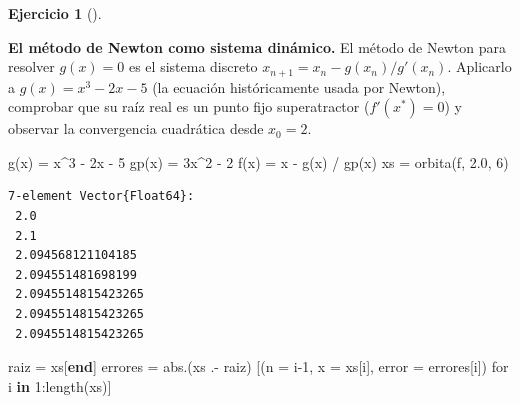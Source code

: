 \documentclass[
  spanish,
  a4paper,
]{scrreport}
\newenvironment{Shaded}{\begin{snugshade}}{\end{snugshade}}
\newcommand{\FloatTok}[1]{\textcolor[rgb]{0.68,0.00,0.00}{#1}}
\newcommand{\FunctionTok}[1]{\textcolor[rgb]{0.28,0.35,0.67}{#1}}
\newcommand{\KeywordTok}[1]{\textcolor[rgb]{0.00,0.23,0.31}{\textbf{#1}}}
\newcommand{\NormalTok}[1]{\textcolor[rgb]{0.00,0.23,0.31}{#1}}
\newcommand{\OperatorTok}[1]{\textcolor[rgb]{0.37,0.37,0.37}{#1}}
\theoremstyle{definition}
\newtheorem{exercise}{Ejercicio}[chapter]
\theoremstyle{remark}
\begin{document}
\begin{exercise}[]\protect\hypertarget{exr-newton-discreto}{}\label{exr-newton-discreto}

\textbf{El método de Newton como sistema dinámico.} El método de Newton
para resolver \(g(x)=0\) es el sistema discreto
\(x_{n+1} = x_n - g(x_n)/g'(x_n)\). Aplicarlo a \(g(x) = x^3 - 2x - 5\)
(la ecuación históricamente usada por Newton), comprobar que su raíz
real es un punto fijo superatractor (\(f'(x^*)=0\)) y observar la
convergencia cuadrática desde \(x_0 = 2\).

\begin{tcolorbox}[enhanced jigsaw, arc=.35mm, bottomrule=.15mm, bottomtitle=1mm, breakable, colback=white, colbacktitle=quarto-callout-tip-color!10!white, colframe=quarto-callout-tip-color-frame, coltitle=black, left=2mm, leftrule=.75mm, opacityback=0, opacitybacktitle=0.6, rightrule=.15mm, title=\textcolor{quarto-callout-tip-color}{\faLightbulb}\hspace{0.5em}{Solución}, titlerule=0mm, toprule=.15mm, toptitle=1mm]

\begin{Shaded}
\begin{Highlighting}[]
\FunctionTok{g}\NormalTok{(x) }\OperatorTok{=}\NormalTok{ x}\OperatorTok{\^{}}\FloatTok{3} \OperatorTok{{-}} \FloatTok{2}\NormalTok{x }\OperatorTok{{-}} \FloatTok{5}
\FunctionTok{gp}\NormalTok{(x) }\OperatorTok{=} \FloatTok{3}\NormalTok{x}\OperatorTok{\^{}}\FloatTok{2} \OperatorTok{{-}} \FloatTok{2}
\FunctionTok{f}\NormalTok{(x) }\OperatorTok{=}\NormalTok{ x }\OperatorTok{{-}} \FunctionTok{g}\NormalTok{(x) }\OperatorTok{/} \FunctionTok{gp}\NormalTok{(x)}
\NormalTok{xs }\OperatorTok{=} \FunctionTok{orbita}\NormalTok{(f, }\FloatTok{2.0}\NormalTok{, }\FloatTok{6}\NormalTok{)}
\end{Highlighting}
\end{Shaded}

\begin{verbatim}
7-element Vector{Float64}:
 2.0
 2.1
 2.094568121104185
 2.094551481698199
 2.0945514815423265
 2.0945514815423265
 2.0945514815423265
\end{verbatim}

\begin{Shaded}
\begin{Highlighting}[]
\NormalTok{raiz }\OperatorTok{=}\NormalTok{ xs[}\KeywordTok{end}\NormalTok{]}
\NormalTok{errores }\OperatorTok{=} \FunctionTok{abs}\NormalTok{.(xs }\OperatorTok{.{-}}\NormalTok{ raiz)}
\NormalTok{[(n }\OperatorTok{=}\NormalTok{ i}\OperatorTok{{-}}\FloatTok{1}\NormalTok{, x }\OperatorTok{=}\NormalTok{ xs[i], error }\OperatorTok{=}\NormalTok{ errores[i]) for i }\KeywordTok{in} \FloatTok{1}\OperatorTok{:}\FunctionTok{length}\NormalTok{(xs)]}
\end{Highlighting}
\end{Shaded}


\end{tcolorbox}
\end{exercise}
\end{document}
